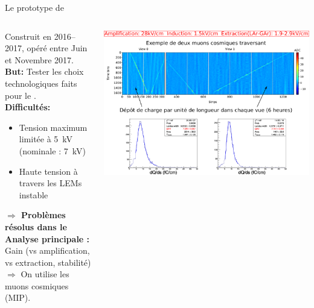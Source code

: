     \begin{frame}{Le prototype de \TOO{}}
    	\begin{scriptsize}
    		\vfill
    		\begin{columns}
    			\begin{column}{0.35\textwidth}
    				Construit en 2016--2017, opéré entre Juin et Novembre 2017.\\
    				\vspace{0.3cm}
    				\textbf{But:} Tester les choix technologiques faits pour le \SSS{}.\\
    				\vspace{0.3cm}
    				\textbf{Difficultés:} 
    				\begin{itemize}
    					\item Tension maximum limitée à \SI{5}{\kilo\volt} (nominale : \SI{7}{\kilo\volt})
    					\item Haute tension à travers les LEMs instable
    				\end{itemize}
    				\textbf{$\Rightarrow$ Problèmes résolus dans le \SSS{}} \\
    				\vspace{0.3cm}
    				\textbf{Analyse principale :} Gain (vs amplification, vs extraction, stabilité)\\
    				$\Rightarrow$ On utilise les muons cosmiques (MIP).
    			\end{column}\hfill
    			\begin{column}{0.65\textwidth}
    				\includegraphics[width=\textwidth]{./pictures/run840.png}\\
    			\end{column}
    		\end{columns}
	    \end{scriptsize}
    \end{frame}

